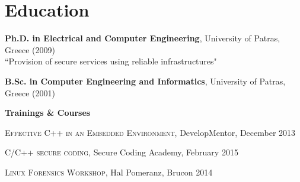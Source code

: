 \documentclass[alan.tex]{subfiles}
\begin{document}
  \section{Education}
  \begin{description}
    \item \textbf{Ph.D. in Electrical and Computer Engineering}, University of Patras, Greece (2009)\\
    ``Provision of secure services using reliable infrastructures"
    \item \textbf{B.Sc. in Computer Engineering and Informatics}, University of Patras, Greece (2001)
  \end{description}
  \begin{description}
  \item \textbf{Trainings \& Courses}
    \begin{description}
      \item \textsc{Effective C++ in an Embedded Environment}, DevelopMentor, December 2013
      \item \textsc{C/C++ secure coding}, Secure Coding Academy, February 2015
      \item \textsc{Linux Forensics Workshop}, Hal Pomeranz, Brucon 2014
    \end{description}
  \end{description}
\end{document}
